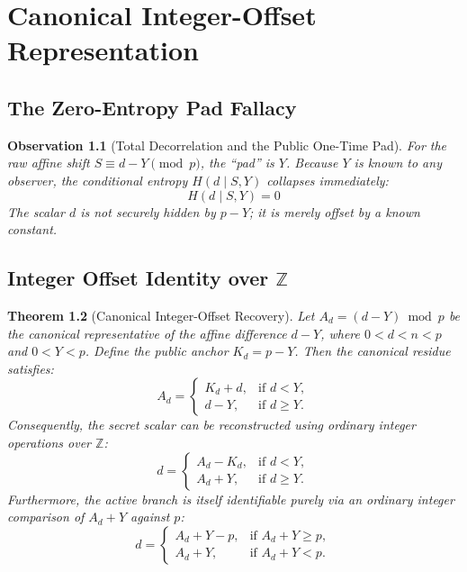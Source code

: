 \documentclass[11pt, a4paper, twoside]{book}
\newtheorem{theorem}{Theorem}[chapter]
\newtheorem{observation}[theorem]{Observation}
\begin{document}
\chapter{Canonical Integer-Offset Representation}

\section{The Zero-Entropy Pad Fallacy}
\begin{observation}[Total Decorrelation and the Public One-Time Pad]
For the raw affine shift $S \equiv d - Y \pmod p$, the ``pad'' is $Y$. Because $Y$ is known to any observer, the conditional entropy $H(d \mid S, Y)$ collapses immediately:
\begin{equation}
    H(d \mid S, Y) = 0
\end{equation}
The scalar $d$ is not securely hidden by $p - Y$; it is merely offset by a known constant.
\end{observation}

\section{Integer Offset Identity over $\mathbb{Z}$}
\begin{theorem}[Canonical Integer-Offset Recovery]
Let $A_d = (d - Y) \bmod p$ be the canonical representative of the affine difference $d - Y$, where $0 < d < n < p$ and $0 < Y < p$. Define the public anchor $K_d = p - Y$. Then the canonical residue satisfies:
\begin{equation}
    A_d = \begin{cases} 
    K_d + d, & \text{if } d < Y, \\ 
    d - Y, & \text{if } d \geq Y.
    \end{cases}
\end{equation}
Consequently, the secret scalar can be reconstructed using ordinary integer operations over $\mathbb{Z}$:
\begin{equation}
    d = \begin{cases} 
    A_d - K_d, & \text{if } d < Y, \\ 
    A_d + Y, & \text{if } d \geq Y.
    \end{cases}
\end{equation}
Furthermore, the active branch is itself identifiable purely via an ordinary integer comparison of $A_d + Y$ against $p$:
\begin{equation}
    d = \begin{cases} 
    A_d + Y - p, & \text{if } A_d + Y \geq p, \\ 
    A_d + Y, & \text{if } A_d + Y < p.
    \end{cases}
\end{equation}
\end{theorem}
\end{document}
